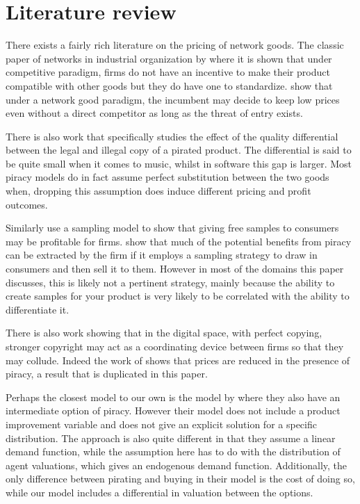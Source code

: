 \documentclass[11pt]{article}
\begin{document}
\section{Literature review}

There exists a fairly rich literature on the pricing of network goods. The classic paper of networks in industrial organization by \citep{KS86} where it is shown that under  competitive paradigm, firms do not have an incentive to make their product compatible with other goods but they do have one to standardize. \cite{FT00} show that under a network good paradigm, the incumbent may decide to keep low prices even without a direct competitor as long as the threat of entry exists.

There is also work that specifically studies the effect of the quality differential between the legal and illegal copy of a pirated product. \cite{GL03} The differential is said to be quite small when it comes to music, whilst in software this gap is larger. Most piracy models do in fact assume perfect substitution between the two goods when, dropping this assumption does induce different pricing and profit outcomes.

Similarly \cite{PW06b} use a sampling model to show that giving free samples to consumers may be profitable for firms. \cite{C05} show that much of the potential benefits from piracy can be extracted by the firm if it employs a sampling strategy to draw in consumers and then sell it to them. However in most of the domains this paper discusses, this is likely not a pertinent strategy, mainly because the ability to create samples for your product is very likely to be correlated with the ability to differentiate it.

There is also work showing that in the digital space, with perfect copying, stronger copyright may act as a coordinating device between firms so that they may collude\citep{J08}. Indeed the work of \citep{S04} shows that prices are reduced in the presence of piracy, a result that is duplicated in this paper.

Perhaps the closest model to our own is the model by \cite{CRP91} where they also have an intermediate option of piracy. However their model does not include a product improvement variable and does not give an explicit solution for a specific distribution. The approach is also quite different in that they assume a linear demand function, while the assumption here has to do with the distribution of agent valuations, which gives an endogenous demand function.  Additionally, the only difference between pirating and buying in their model is the cost of doing so, while our model includes a differential in valuation between the options. 
\end{document}
